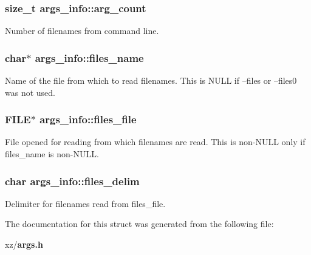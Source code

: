 \subsubsection[{arg\-\_\-count}]{\setlength{\rightskip}{0pt plus 5cm}size\-\_\-t args\-\_\-info\-::arg\-\_\-count}\label{structargs__info_ae3b50a3ac7276c65d21e711a474b8f54}


Number of filenames from command line. 

\subsubsection[{files\-\_\-name}]{\setlength{\rightskip}{0pt plus 5cm}char$\ast$ args\-\_\-info\-::files\-\_\-name}\label{structargs__info_a4f3579733d0f2618b53bc4f5e7d16026}
Name of the file from which to read filenames. This is N\-U\-L\-L if --files or --files0 was not used. 
\subsubsection[{files\-\_\-file}]{\setlength{\rightskip}{0pt plus 5cm}F\-I\-L\-E$\ast$ args\-\_\-info\-::files\-\_\-file}\label{structargs__info_a1fb4e81e69ac5217c1b89c17e7bdb24e}
File opened for reading from which filenames are read. This is non-\/\-N\-U\-L\-L only if files\-\_\-name is non-\/\-N\-U\-L\-L. 
\subsubsection[{files\-\_\-delim}]{\setlength{\rightskip}{0pt plus 5cm}char args\-\_\-info\-::files\-\_\-delim}\label{structargs__info_aa9a2d68abe3e224bcc970f5b3d9184e6}


Delimiter for filenames read from files\-\_\-file. 



The documentation for this struct was generated from the following file\-:\begin{DoxyCompactItemize}
\item 
xz/{\bf args.\-h}\end{DoxyCompactItemize}
